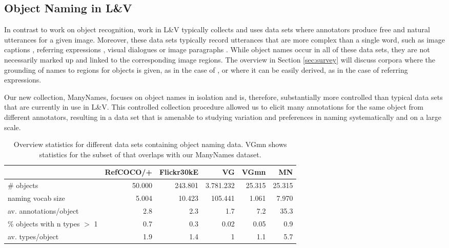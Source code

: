 \subsection{Object Naming in L\&V} 

In contrast to work on object recognition, work in L\&V typically collects and uses data sets where annotators produce free and natural utterances for a given image. 
Moreover, these data sets typically record utterances that are more complex than a single word, such as image captions \cite{fangetal:2015,devlin:imcaqui,Bernardietal:automatic}, referring expressions \cite{Kazemzadeh2014,mao15,Yu2016}, visual dialogues \cite{das2017visual,vries2017guesswhat} or image paragraphs \cite{krause2017hierarchical}. While object names occur in all of these data sets, they are not necessarily marked up and linked to the corresponding image regions. The overview in Section \ref{sec:survey} will discuss corpora where the grounding of names to regions for objects is given, as in the case of \vgenome \cite{krishna2016visualgenome}, or where it can be easily derived, as in the case of referring expressions.

Our new collection, ManyNames, focuses on object names in isolation and is, therefore, substantially more controlled than typical data sets that are currently in use in L\&V. This controlled collection procedure allowed us to elicit many annotations for the same object from different annotators, resulting in a data set that is amenable to studying variation and preferences in naming systematically and on a large scale.

\begin{table*}[htb]
  \centering
  \begin{tabular}{lrrrrr}
    \toprule
    &   RefCOCO/+  &  Flickr30kE &           VG &      VGmn &        MN \\
    \midrule
    \# objects & 50.000 & 243.801 & 3.781.232 & 25.315 & 25.315 \\
    naming vocab size &  5.004 &  10.423 &   105.441 &  1.061 &  7.970 \\
    av. annotations/object &      2.8 &       2.3 &         1.7 &      7.2 &     35.3 \\
    \% objects with n types $>$ 1 &      0.7 &       0.3 &         0.02 &      0.05 &      0.9 \\
    av. types/object &      1.9 &       1.4 &         1 &      1.1 &      5.7 \\
    \bottomrule
  \end{tabular}
  \caption{Overview statistics for different data sets containing object naming data. VGmn shows statistics for the subset of \vg that overlaps with our ManyNames dataset.\label{tab:compare}}
\end{table*}


